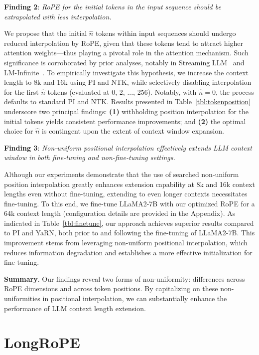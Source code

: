 \textbf{Finding 2}: \textit{RoPE for the initial tokens in the input sequence should be extrapolated with less interpolation.} 

We propose that the initial $\hat{n}$ tokens within input sequences should undergo reduced interpolation by RoPE, given that these tokens tend to attract higher attention weights—thus playing a pivotal role in the attention mechanism. Such significance is corroborated by prior analyses, notably in Streaming LLM~\cite{streamingllm} and LM-Infinite~\cite{han2023lminfinite}. To empirically investigate this hypothesis, we increase the context length to 8k and 16k using PI and NTK, while selectively disabling interpolation for the first $\hat n$ tokens (evaluated at 0, 2, ..., 256). Notably, with $\hat n=0$, the process defaults to standard PI and NTK. Results presented in Table~\ref{tbl:tokenposition} underscore two principal findings: \textbf{(1)} withholding position interpolation for the initial tokens yields consistent performance improvements; and \textbf{(2)} the optimal choice for $\hat n$ is contingent upon the extent of context window expansion.

\textbf{Finding 3}: \textit{Non-uniform positional interpolation effectively extends LLM context window in both fine-tuning and non-fine-tuning settings.} 

Although our experiments demonstrate that the use of searched non-uniform position interpolation greatly enhances extension capability at 8k and 16k context lengths even without fine-tuning, extending to even longer contexts necessitates fine-tuning. To this end, we fine-tune LLaMA2-7B with our optimized RoPE for a 64k context length (configuration details are provided in the Appendix). As indicated in Table~\ref{tbl:finetune}, our approach achieves superior results compared to PI and YaRN, both prior to and following the fine-tuning of LLaMA2-7B. This improvement stems from leveraging non-uniform positional interpolation, which reduces information degradation and establishes a more effective initialization for fine-tuning.

\textbf{Summary}. Our findings reveal two forms of non-uniformity: differences across RoPE dimensions and across token positions. By capitalizing on these non-uniformities in positional interpolation, we can substantially enhance the performance of LLM context length extension.

\section{LongRoPE}


